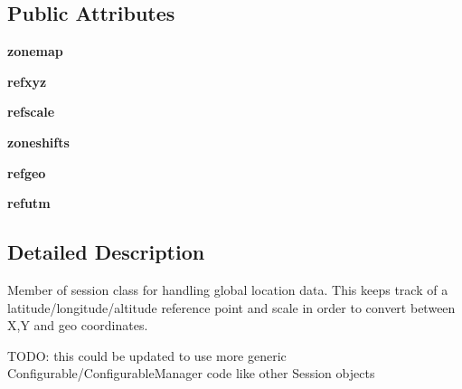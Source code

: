 \subsection*{Public Attributes}
\begin{DoxyCompactItemize}
\item 
\hypertarget{classcore_1_1location_1_1_core_location_abbf26f64a5a8d5a26b8316627056d09d}{{\bfseries zonemap}}\label{classcore_1_1location_1_1_core_location_abbf26f64a5a8d5a26b8316627056d09d}

\item 
\hypertarget{classcore_1_1location_1_1_core_location_ab5e41cda0b172142ef458a1ed3095570}{{\bfseries refxyz}}\label{classcore_1_1location_1_1_core_location_ab5e41cda0b172142ef458a1ed3095570}

\item 
\hypertarget{classcore_1_1location_1_1_core_location_ad4e5ac62cb389fcf7ee75bc4afcaf2bc}{{\bfseries refscale}}\label{classcore_1_1location_1_1_core_location_ad4e5ac62cb389fcf7ee75bc4afcaf2bc}

\item 
\hypertarget{classcore_1_1location_1_1_core_location_a21099fda3e4b3f5e53ffa8484ff83b1e}{{\bfseries zoneshifts}}\label{classcore_1_1location_1_1_core_location_a21099fda3e4b3f5e53ffa8484ff83b1e}

\item 
\hypertarget{classcore_1_1location_1_1_core_location_a08dc465a1083c7ce26b61655ed30174d}{{\bfseries refgeo}}\label{classcore_1_1location_1_1_core_location_a08dc465a1083c7ce26b61655ed30174d}

\item 
\hypertarget{classcore_1_1location_1_1_core_location_a4b678b6c25ef458b1a200e06ac99b4a0}{{\bfseries refutm}}\label{classcore_1_1location_1_1_core_location_a4b678b6c25ef458b1a200e06ac99b4a0}

\end{DoxyCompactItemize}


\subsection{Detailed Description}
\begin{DoxyVerb}Member of session class for handling global location data. This keeps
    track of a latitude/longitude/altitude reference point and scale in
    order to convert between X,Y and geo coordinates.
    
    TODO: this could be updated to use more generic 
          Configurable/ConfigurableManager code like other Session objects
\end{DoxyVerb}
 

